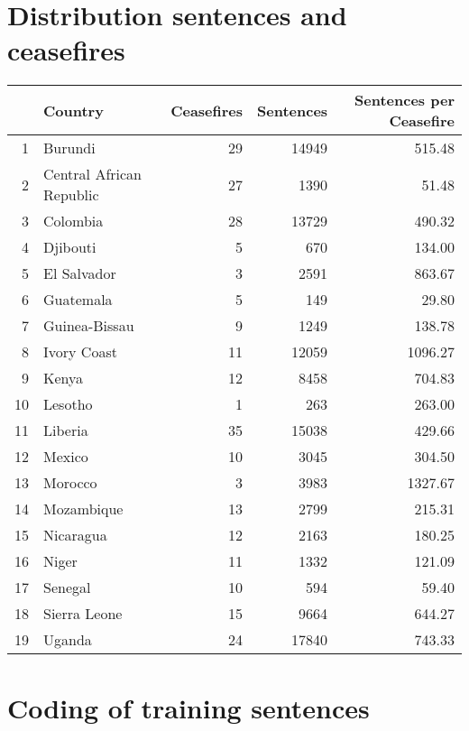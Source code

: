 \documentclass[12pt,twoside]{reedthesis}
\begin{document}
\section*{Distribution sentences and
ceasefires}\label{distribution-sentences-and-ceasefires}
\begin{table}[ht]
\centering
\begin{tabular}{rlrrr}
  \hline
 & Country & Ceasefires & Sentences & Sentences per Ceasefire \\ 
  \hline
1 & Burundi &  29 & 14949 & 515.48 \\ 
  2 & Central African Republic &  27 & 1390 & 51.48 \\ 
  3 & Colombia &  28 & 13729 & 490.32 \\ 
  4 & Djibouti &   5 & 670 & 134.00 \\ 
  5 & El Salvador &   3 & 2591 & 863.67 \\ 
  6 & Guatemala &   5 & 149 & 29.80 \\ 
  7 & Guinea-Bissau &   9 & 1249 & 138.78 \\ 
  8 & Ivory Coast &  11 & 12059 & 1096.27 \\ 
  9 & Kenya &  12 & 8458 & 704.83 \\ 
  10 & Lesotho &   1 & 263 & 263.00 \\ 
  11 & Liberia &  35 & 15038 & 429.66 \\ 
  12 & Mexico &  10 & 3045 & 304.50 \\ 
  13 & Morocco &   3 & 3983 & 1327.67 \\ 
  14 & Mozambique &  13 & 2799 & 215.31 \\ 
  15 & Nicaragua &  12 & 2163 & 180.25 \\ 
  16 & Niger &  11 & 1332 & 121.09 \\ 
  17 & Senegal &  10 & 594 & 59.40 \\ 
  18 & Sierra Leone &  15 & 9664 & 644.27 \\ 
  19 & Uganda &  24 & 17840 & 743.33 \\ 
   \hline
\end{tabular}
\end{table}\newpage
\section*{Coding of training
sentences}\label{coding-of-training-sentences}
\end{document}
